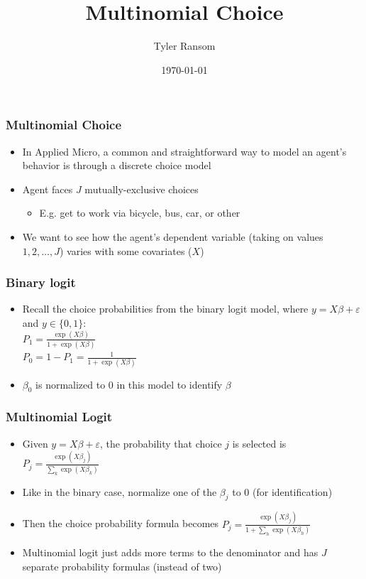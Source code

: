 \documentclass[english,xcolor=dvipsnames]{beamer}
\title[]{Multinomial Choice}
\author{Tyler Ransom}
\institute{Duke University}
\date{\today}
\newcommand{\bi}{\begin{itemize}}
\newcommand{\ei}{\end{itemize}}
\begin{document}
\begin{frame}
   \titlepage
\end{frame}

\begin{frame}
\frametitle{Multinomial Choice}
   \bi 
   \item In Applied Micro, a common and straightforward way to model an agent's behavior is through a discrete choice model
   \item Agent faces $J$ mutually-exclusive choices
      \bi 
      \item E.g. get to work via bicycle, bus, car, or other
      \ei
   \item We want to see how the agent's dependent variable (taking on values $1, 2, \ldots, J$) varies with some covariates ($X$)
   \ei
\end{frame}

\begin{frame}
\frametitle{Binary logit}
   \bi 
   \item Recall the choice probabilities from the binary logit model, where $y = X\beta + \varepsilon$ and $y \in \{0,1\}$:\\ $P_{1} = \frac{\exp(X\beta)}{1+\exp(X\beta)}$\\ $P_{0} = 1-P_{1} = \frac{1}{1+\exp(X\beta)}$
   \item $\beta_{0}$ is normalized to $0$ in this model to identify $\beta$
   \ei
\end{frame}

\begin{frame}
\frametitle{Multinomial Logit}
   \bi 
   \item Given $y=X\beta + \varepsilon$, the probability that choice $j$ is selected is $P_{j} = \frac{\exp(X\beta_{j})}{\sum_{k} \exp(X\beta_{k})}$
   \item Like in the binary case, normalize one of the $\beta_{j}$ to $0$ (for identification)
   \item Then the choice probability formula becomes $P_{j} = \frac{\exp(X\beta_{j})}{1+\sum_{h}\exp(X\beta_{h})}$
   \item Multinomial logit just adds more terms to the denominator and has $J$ separate probability formulas (instead of two)
   \ei
\end{frame}
\end{document}
